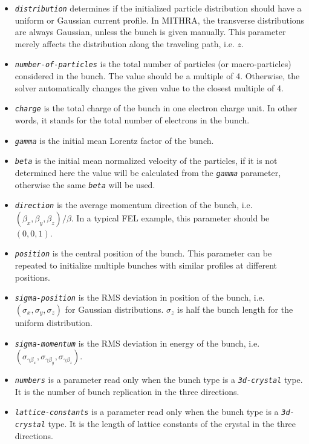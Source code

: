 \begin{enumerate}
\begin{itemize}
\begin{enumerate}
\end{enumerate}
%
\item {\tt \small \em distribution} determines if the initialized particle distribution should have a uniform or Gaussian current profile. In MITHRA, the transverse distributions are always Gaussian, unless the bunch is given manually. This parameter merely affects the distribution along the traveling path, i.e. $z$.
%
\item {\tt \small \em number-of-particles} is the total number of particles (or macro-particles) considered in the bunch. The value should be a multiple of 4. Otherwise, the solver automatically changes the given value to the closest multiple of 4.
%
\item {\tt \small \em charge} is the total charge of the bunch in one electron charge unit. In other words, it stands for the total number of electrons in the bunch.
%
\item {\tt \small \em gamma} is the initial mean Lorentz factor of the bunch.
%
\item {\tt \small \em beta} is the initial mean normalized velocity of the particles, if it is not determined here the value will be calculated from the {\tt \small \em gamma} parameter, otherwise the same {\tt \small \em beta} will be used.
%
\item {\tt \small \em direction} is the average momentum direction of the bunch, i.e. $(\beta_x, \beta_y, \beta_z)/\beta$. In a typical FEL example, this parameter should be $(0, 0, 1)$.
%
\item {\tt \small \em position} is the central position of the bunch. This parameter can be repeated to initialize multiple bunches with similar profiles at different positions.
%
\item {\tt \small \em sigma-position} is the RMS deviation in position of the bunch, i.e. $(\sigma_x, \sigma_y, \sigma_z)$ for Gaussian distributions. $\sigma_z$ is half the bunch length for the uniform distribution.
%
\item {\tt \small \em sigma-momentum} is the RMS deviation in energy of the bunch, i.e. $(\sigma_{\gamma \beta_x}, \sigma_{\gamma \beta_y}, \sigma_{\gamma \beta_z})$.
%
\item {\tt \small \em numbers} is a parameter read only when the bunch type is a {\tt \small \em 3d-crystal} type. It is the number of bunch replication in the three directions.
%
\item {\tt \small \em lattice-constants} is a parameter read only when the bunch type is a {\tt \small \em 3d-crystal} type. It is the length of lattice constants of the crystal in the three directions.

\end{itemize}
\end{enumerate}
